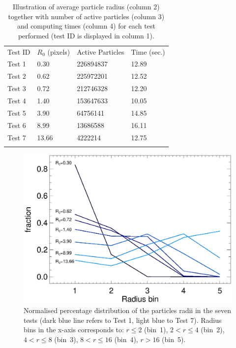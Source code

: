 \documentclass[smallextended]{svjour3}
\begin{document}
\begin{table}
\caption{Illustration of average particle radius (column 2) together with number of active particles (column 3)
and computing times (column 4) for each test performed (test ID is displayed in column 1).}
\label{tab:radius}
\begin{tabular}{llll}
\hline\noalign{\smallskip}
Test ID & $R_0$ (pixels) & Active Particles & Time (sec.) \\
\noalign{\smallskip} \hline \noalign{\smallskip}
Test 1  & 0.30   & 226894837  & 12.89 \\
Test 2  & 0.62   & 225972201  & 12.52 \\
Test 3  & 0.72   & 212746328  & 12.20 \\
Test 4  & 1.40   & 153647633  & 10.05 \\
Test 5  & 3.90   & 64756141   & 14.85 \\
Test 6  & 8.99   & 13686588   & 16.11 \\
Test 7  & 13.66  & 4222214    & 12.75 \\
\noalign{\smallskip} \hline
\end{tabular}
\end{table}

\begin{figure}
\includegraphics[scale=0.5]{radii.eps}
\caption{Normalised percentage distribution of the particles radii in the seven tests (dark blue line refers to Test 1, light blue to Test 7). Radius bins in the x-axis corresponds to: $r\le 2$ (bin~1), $2<r\le 4$ (bin~2), $4<r\le 8$ (bin~3), $8<r\le 16$ (bin~4), $r>16$ (bin~5). 
}
\label{fig:radii}
\end{figure}
\end{document}

